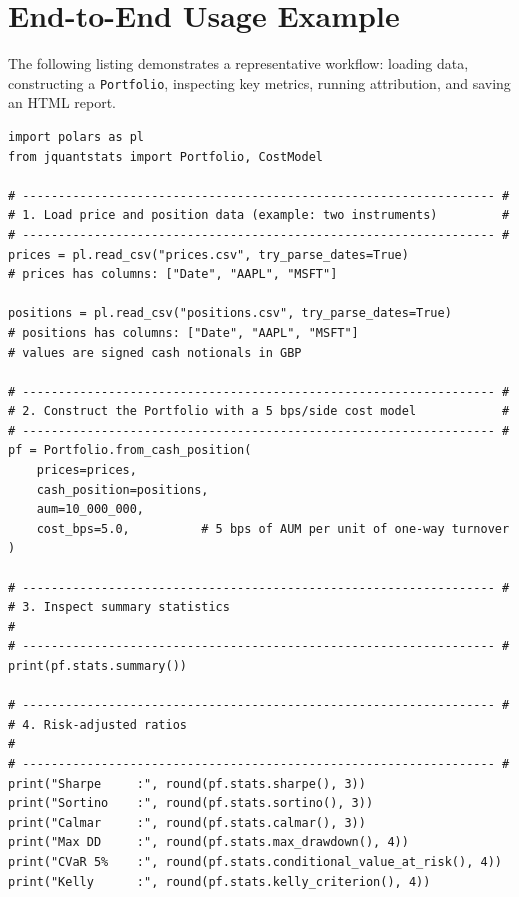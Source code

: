 \documentclass[11pt,a4paper]{article}
\begin{document}
\section{End-to-End Usage Example}
\label{sec:usage}

The following listing demonstrates a representative workflow: loading data,
constructing a \texttt{Portfolio}, inspecting key metrics, running attribution,
and saving an HTML report.

\begin{lstlisting}[caption={Complete usage example.}]
import polars as pl
from jquantstats import Portfolio, CostModel

# ------------------------------------------------------------------ #
# 1. Load price and position data (example: two instruments)         #
# ------------------------------------------------------------------ #
prices = pl.read_csv("prices.csv", try_parse_dates=True)
# prices has columns: ["Date", "AAPL", "MSFT"]

positions = pl.read_csv("positions.csv", try_parse_dates=True)
# positions has columns: ["Date", "AAPL", "MSFT"]
# values are signed cash notionals in GBP

# ------------------------------------------------------------------ #
# 2. Construct the Portfolio with a 5 bps/side cost model            #
# ------------------------------------------------------------------ #
pf = Portfolio.from_cash_position(
    prices=prices,
    cash_position=positions,
    aum=10_000_000,
    cost_bps=5.0,          # 5 bps of AUM per unit of one-way turnover
)

# ------------------------------------------------------------------ #
# 3. Inspect summary statistics                                       #
# ------------------------------------------------------------------ #
print(pf.stats.summary())

# ------------------------------------------------------------------ #
# 4. Risk-adjusted ratios                                             #
# ------------------------------------------------------------------ #
print("Sharpe     :", round(pf.stats.sharpe(), 3))
print("Sortino    :", round(pf.stats.sortino(), 3))
print("Calmar     :", round(pf.stats.calmar(), 3))
print("Max DD     :", round(pf.stats.max_drawdown(), 4))
print("CVaR 5%    :", round(pf.stats.conditional_value_at_risk(), 4))
print("Kelly      :", round(pf.stats.kelly_criterion(), 4))


\end{lstlisting}
\end{document}

